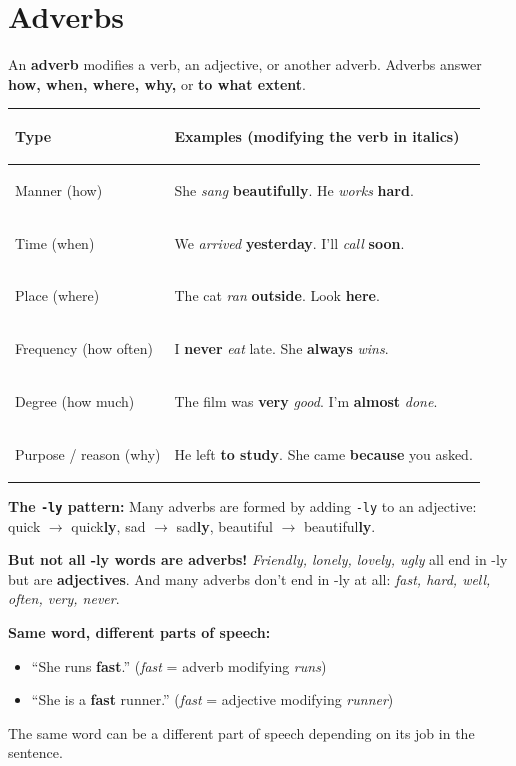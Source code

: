 \documentclass[11pt, letterpaper]{article}
\newcommand{\example}[1]{%
  \begin{tcolorbox}[colback=exbg, colframe=exborder,
    title={\bfseries Example}, arc=3pt, boxrule=1pt]
  #1
  \end{tcolorbox}%
}
\begin{document}
\section*{Adverbs}

An \textbf{adverb} modifies a verb, an adjective, or another adverb. Adverbs answer
\textbf{how, when, where, why,} or \textbf{to what extent}.

\noindent
{\renewcommand{\arraystretch}{1.5}
\begin{tabularx}{\textwidth}{>{\bfseries\raggedright\arraybackslash}p{2.5cm}
                              >{\raggedright\arraybackslash}X}
\toprule
\rowcolor{tableheader}
\textbf{Type} & \textbf{Examples (modifying the verb in italics)} \\
\midrule
\rowcolor{rowA}  Manner (how)        & She \emph{sang} \textbf{beautifully}. He \emph{works} \textbf{hard}. \\
\rowcolor{rowB}  Time (when)         & We \emph{arrived} \textbf{yesterday}. I'll \emph{call} \textbf{soon}. \\
\rowcolor{rowA}  Place (where)       & The cat \emph{ran} \textbf{outside}. Look \textbf{here}. \\
\rowcolor{rowB}  Frequency (how often) & I \textbf{never} \emph{eat} late. She \textbf{always} \emph{wins}. \\
\rowcolor{rowA}  Degree (how much)   & The film was \textbf{very} \emph{good}. I'm \textbf{almost} \emph{done}. \\
\rowcolor{rowB}  Purpose / reason (why) & He left \textbf{to study}. She came \textbf{because} you asked. \\
\bottomrule
\end{tabularx}}

\textbf{The \texttt{-ly} pattern:} Many adverbs are formed by adding \texttt{-ly} to an adjective:
quick $\to$ quick\textbf{ly}, sad $\to$ sad\textbf{ly}, beautiful $\to$ beautiful\textbf{ly}.

\textbf{But not all -ly words are adverbs!} \emph{Friendly, lonely, lovely, ugly} all end in -ly
but are \textbf{adjectives}. And many adverbs don't end in -ly at all: \emph{fast, hard, well, often, very, never}.

\example{
\textbf{Same word, different parts of speech:}
\begin{itemize}[noitemsep, leftmargin=*]
  \item ``She runs \textbf{fast}.'' (\emph{fast} = adverb modifying \emph{runs})
  \item ``She is a \textbf{fast} runner.'' (\emph{fast} = adjective modifying \emph{runner})
\end{itemize}
The same word can be a different part of speech depending on its job in the sentence.
}
\end{document}
